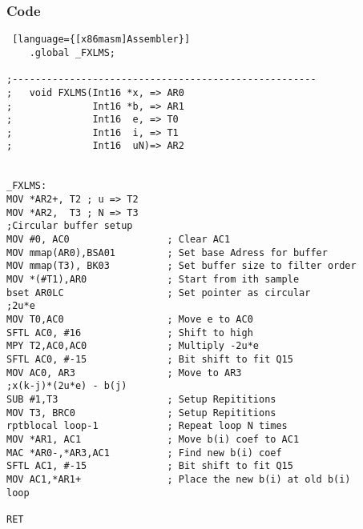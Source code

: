 \subsubsection{Code}
\begin{lstlisting} [language={[x86masm]Assembler}]
	.global _FXLMS;

;-----------------------------------------------------    
;	void FXLMS(Int16 *x, => AR0
;			   Int16 *b, => AR1
;			   Int16  e, => T0
;			   Int16  i, => T1
;			   Int16  uN)=> AR2


_FXLMS:
MOV *AR2+, T2 ; u => T2
MOV *AR2,  T3 ; N => T3
;Circular buffer setup
MOV #0, AC0					; Clear AC1
MOV mmap(AR0),BSA01			; Set base Adress for buffer
MOV mmap(T3), BK03			; Set buffer size to filter order
MOV *(#T1),AR0				; Start from ith sample
bset AR0LC					; Set pointer as circular
;2u*e
MOV T0,AC0					; Move e to AC0			
SFTL AC0, #16				; Shift to high
MPY T2,AC0,AC0				; Multiply -2u*e
SFTL AC0, #-15				; Bit shift to fit Q15
MOV AC0, AR3				; Move to AR3
;x(k-j)*(2u*e) - b(j)
SUB #1,T3					; Setup Repititions
MOV T3, BRC0				; Setup Repititions
rptblocal loop-1			; Repeat loop N times
MOV *AR1, AC1				; Move b(i) coef to AC1
MAC *AR0-,*AR3,AC1			; Find new b(i) coef
SFTL AC1, #-15				; Bit shift to fit Q15
MOV AC1,*AR1+ 				; Place the new b(i) at old b(i) 
loop

RET
\end{lstlisting}
